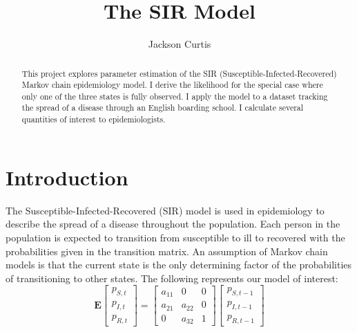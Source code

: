 \documentclass{svproc}
\begin{document}
\mainmatter              
\title{The SIR Model}


\author{Jackson Curtis}

\maketitle           

\begin{abstract}
This project explores parameter estimation of the SIR (Susceptible-Infected-Recovered) Markov chain epidemiology model. I derive the likelihood for the special case where only one of the three states is fully observed. I apply the model to a dataset tracking the spread of a disease through an English boarding school. I calculate several quantities of interest to epidemiologists.
\end{abstract}

\section{Introduction}
The Susceptible-Infected-Recovered (SIR) model is used in epidemiology to describe the spread of a disease throughout the population. Each person in the population is expected to transition from susceptible to ill to recovered with the probabilities given in the transition matrix. An assumption of Markov chain models is that the current state is the only determining factor of the probabilities of transitioning to other states. The following represents our model of interest:
\begin{equation}
\mathbf{E}\begin{bmatrix}
    p_{S,t}       \\
    p_{I,t}      \\

    p_{R,t}     
\end{bmatrix}
=
\begin{bmatrix}
a_{11} & 0 & 0 \\
a_{21} & a_{22} & 0 \\
0 & a_{32} & 1
\end{bmatrix}
\begin{bmatrix}
    p_{S,t-1}       \\
    p_{I,t-1}      \\

    p_{R,t-1}     
\end{bmatrix}
\label{e1}
\end{equation}
\end{document}
